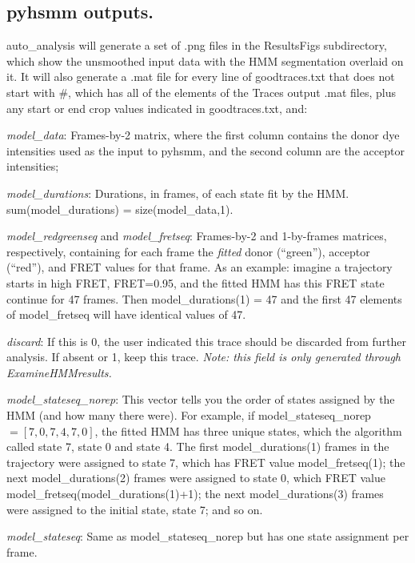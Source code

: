 \documentclass[11pt]{article}
\begin{document}
\subsection{pyhsmm outputs.}

auto\_analysis will generate a set of .png files in the ResultsFigs subdirectory, which show the unsmoothed input data with the HMM segmentation overlaid on it. It will also generate a .mat file for every line of goodtraces.txt that does not start with \#, which has all of the elements of the Traces output .mat files, plus any start or end crop values indicated in goodtraces.txt, and:

{\it model\_data}: Frames-by-2 matrix, where the first column contains the donor dye intensities used as the input to pyhsmm, and the second column are the acceptor intensities;

{\it model\_durations}: Durations, in frames, of each state fit by the HMM. sum(model\_durations) = size(model\_data,1).

{\it model\_redgreenseq} and {\it model\_fretseq}: Frames-by-2 and 1-by-frames matrices, respectively, containing for each frame the {\it fitted} donor (``green''), acceptor (``red''), and FRET values for that frame. As an example: imagine a trajectory starts in high FRET, FRET=0.95, and the fitted HMM has this FRET state continue for 47 frames. Then model\_durations(1) = 47 and the first 47 elements of model\_fretseq will have identical values of 47.

{\it discard}: If this is 0, the user indicated this trace should be discarded from further analysis. If absent or 1, keep this trace. {\it Note: this field is only generated through ExamineHMMresults.}

{\it model\_stateseq\_norep}: This vector tells you the order of states assigned by the HMM (and how many there were). For example, if model\_stateseq\_norep $=[7,0,7,4,7,0]$, the fitted HMM has three unique states, which the algorithm called state 7, state 0 and state 4. The first model\_durations(1) frames in the trajectory were assigned to state 7, which has FRET value model\_fretseq(1); the next model\_durations(2) frames were assigned to state 0, which FRET value model\_fretseq(model\_durations(1)+1); the next model\_durations(3) frames were assigned to the initial state, state 7; and so on. 

{\it model\_stateseq}: Same as model\_stateseq\_norep but has one state assignment per frame. \\
\end{document}
